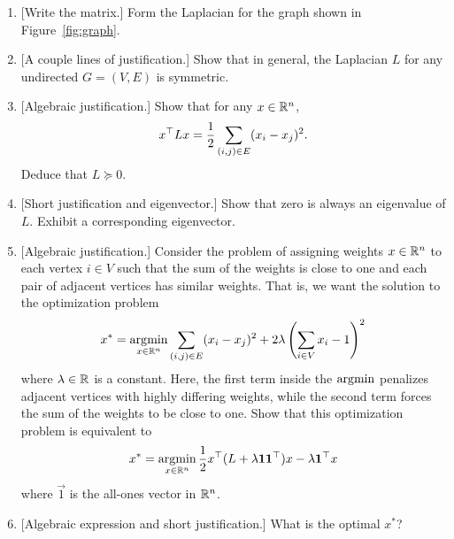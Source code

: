 \begin{enumerate}
    \item {[Write the matrix.]} Form the Laplacian for the graph shown in Figure~\ref{fig:graph}.
    
    \sol{}
    \item {[A couple lines of justification.]}
    Show that in general, the Laplacian $L$ for any undirected $G=(V,E)$ is symmetric.
    
    \sol{}
    \item {[Algebraic justification.]}
    Show that for any $x\in \mathbb{R}^{n}$,
    \begin{equation*}
        x^{\top} L x=\dfrac{1}{2}\sum_{(i,j)\in E}(x_i-x_j)^2.
    \end{equation*}
    Deduce that $L\succeq 0$.
    
    \sol{}
    \item {[Short justification and eigenvector.]}
    Show that zero is always an eigenvalue of $L$. Exhibit a corresponding eigenvector.
    
    \sol{}
    \item {[Algebraic justification.]}
    Consider the problem of assigning weights $x\in\mathbb{R}^{n}$ to each vertex $i\in V$ such that the sum of the weights is close to one and each pair of adjacent vertices has similar weights. That is, we want the solution to the optimization problem
    \begin{equation*}
        x^*=\operatorname*{\arg\!\min}_{x\in\mathbb{R}^{n}} \sum_{(i,j)\in E}(x_i-x_j)^2+2\lambda\left(\sum_{i\in V}x_i-1\right)^2
    \end{equation*}
    where $\lambda\in\mathbb{R}^{}$ is a constant. Here, the first term inside the $\operatorname*{\arg\!\min}$ penalizes adjacent vertices with highly differing weights, while the second term forces the sum of the weights to be close to one. Show that this optimization problem is equivalent to
    \begin{equation*}
        x^*=\operatorname*{\arg\!\min}_{x\in\mathbb{R}^{n}} \dfrac{1}{2}x^{\top} (L+\lambda \mathbf{1}\mathbf{1}^{\top})x-\lambda \mathbf{1}^{\top} x
    \end{equation*}
    where $\vec{1}$ is the all-ones vector in $\mathbb{R}^{n}$.
    
    \sol{}
    \item {[Algebraic expression and short justification.]}
    What is the optimal $x^*$?
    

\end{enumerate}
